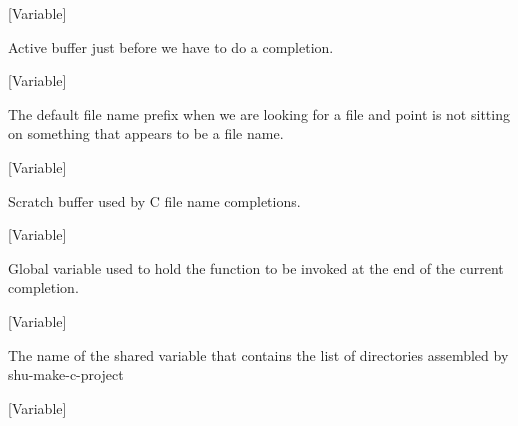 \vspace{1em}
\noindent
{}
\usebox{\funcname}
 \hfill [Variable]

\begin{doc-string}
Active buffer just before we have to do a completion.
\end{doc-string}

\vspace{1em}
\noindent
{}
\usebox{\funcname}
 \hfill [Variable]

\begin{doc-string}
The default file name prefix when we are looking for a file and point is not
sitting on something that appears to be a file name.
\end{doc-string}

\vspace{1em}
\noindent
{}
\usebox{\funcname}
 \hfill [Variable]

\begin{doc-string}
Scratch buffer used by C file name completions.
\end{doc-string}

\vspace{1em}
\noindent
{}
\usebox{\funcname}
 \hfill [Variable]

\begin{doc-string}
Global variable used to hold the function to be invoked at the end of the
current completion.
\end{doc-string}

\vspace{1em}
\noindent
{}
\usebox{\funcname}
 \hfill [Variable]

\begin{doc-string}
The name of the shared variable that contains the list of directories assembled
by shu-make-c-project
\end{doc-string}

\vspace{1em}
\noindent
{}
\usebox{\funcname}
 \hfill [Variable]

